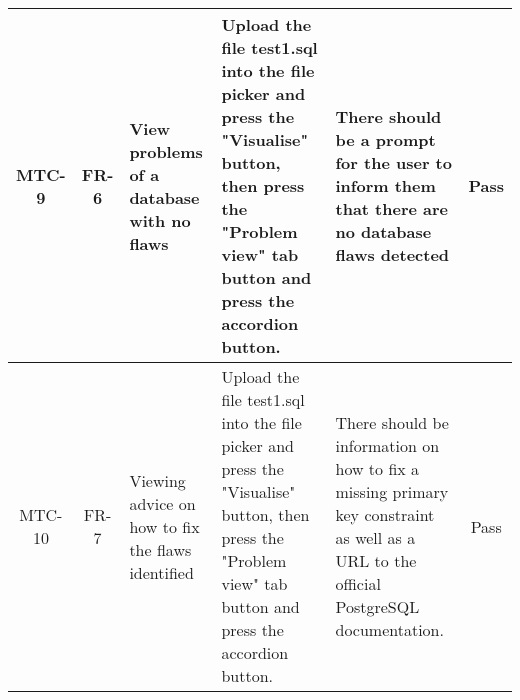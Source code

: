 \begin{center}
\begin{tabularx}{\textwidth}{|c|c|X|X|X|c|}
		\hline
		MTC-9 & FR-6 & View problems of a database with no flaws & Upload the file test1.sql into the file picker and press the "Visualise" button, then press the "Problem view" tab button and press the accordion button. & There should be a prompt for the user to inform them that there are no database flaws detected & Pass \\
		\hline
		MTC-10 & FR-7 & Viewing advice on how to fix the flaws identified & Upload the file test1.sql into the file picker and press the "Visualise" button, then press the "Problem view" tab button and press the accordion button. & There should be information on how to fix a missing primary key constraint as well as a URL to the official PostgreSQL documentation. & Pass \\
		\hline
	\end{tabularx}
\end{center}


